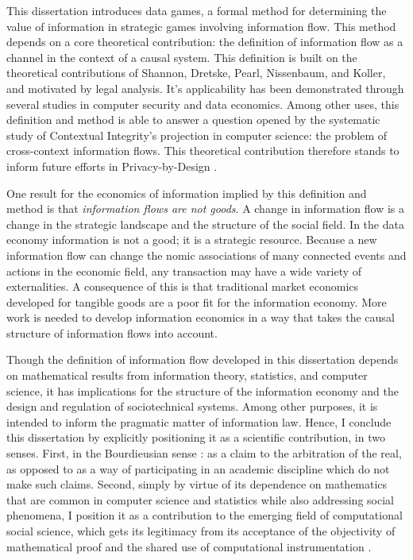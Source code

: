 \documentclass[../thesis.tex]{subfiles}
\begin{document}
 This dissertation introduces data games,
 a formal method for determining
 the value of information in strategic games involving information
 flow.
 This method depends on a core theoretical contribution:
 the definition of information flow as a channel in the context
 of a causal system.
 This definition is built on the theoretical contributions
 of Shannon, Dretske, Pearl, Nissenbaum, and Koller,
 and motivated by legal analysis.
 It's applicability has been demonstrated through several
 studies in computer security and data economics.
 Among other uses, this definition and method is able
 to answer a question opened by the systematic study
 of Contextual Integrity's projection in computer science:
 the problem of cross-context information flows.
 This theoretical contribution therefore stands to inform
 future efforts in Privacy-by-Design \cite{gurses2011engineering}.

 One result for the economics of information implied by
 this definition and method is that
 \textit{information flows are not goods}.
 A change in information flow is a change in the strategic landscape
 and the structure of the social field.
 In the data economy information is not a good;
 it is a strategic resource.
 Because a new information flow can change the nomic associations
 of many connected events and actions in the economic field,
 any transaction may have a wide variety of externalities.
 A consequence of this is that traditional market economics
 developed for tangible goods are a poor fit for the information
 economy.
 More work is needed to develop information economics in a way
 that takes the causal structure of information flows into
 account.
 
 Though the definition of information flow developed in
 this dissertation depends on mathematical results
 from information theory, statistics, and computer science,
 it has implications for the structure of the information
 economy and the design and regulation of sociotechnical systems.
 Among other purposes, it is intended to inform the pragmatic
 matter of information law.
 Hence, I conclude this dissertation by explicitly positioning it
 as a scientific contribution, in two senses.
 First, in the Bourdieusian sense 
 \citep{bourdieu2004science}: as a claim to the arbitration of
 the real, as opposed to as a way of participating in
 an academic discipline which do not make such claims.
 Second, simply by virtue of its dependence on
 mathematics that are common in computer science
 and statistics while also addressing social phenomena,
 I position it as a contribution
 to the emerging field of
 computational social science, which gets its legitimacy
 from its acceptance of the objectivity of mathematical
 proof and the shared use of computational instrumentation
 \citep{benthall2016philosophy}.
\end{document}
